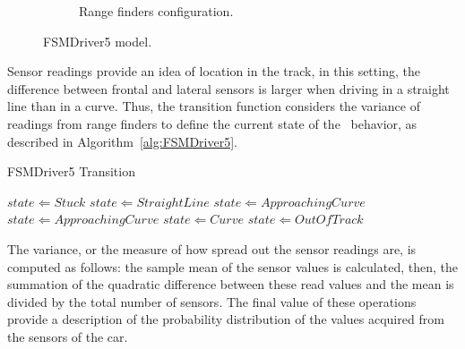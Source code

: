 \begin{figure}
\begin{subfigure}[b]{0.4\textwidth}
   \caption{Range finders configuration.}\label{fig:FSMDriver5Finders}%
\end{subfigure}
   \caption{FSMDriver5 model.}\label{fig:FSMDriver5}
\end{figure}

Sensor readings provide an idea of location in the track, in this setting, the difference between frontal and lateral sensors is larger when driving in a straight line than in a curve. Thus, the transition function considers the variance of readings from range finders to define the current state of the \racing~behavior, as described in Algorithm~\ref{alg:FSMDriver5}.

\begin{algorithm}[h]%
\caption{FSMDriver5 Transition}%
\label{alg:FSMDriver5}%
\begin{algorithmic}
        \STATE $state \Leftarrow Stuck$
    \ELSE
			\STATE $state \Leftarrow StraightLine$
			\STATE $state \Leftarrow ApproachingCurve$
			\STATE $state \Leftarrow ApproachingCurve$
			\STATE $state \Leftarrow Curve$
		\ELSE
			\STATE $state \Leftarrow Out Of Track$
		\ENDIF
	\ENDIF
\end{algorithmic}
\end{algorithm}

The variance, or the measure of how spread out the sensor readings are, is computed as follows: the sample mean of the sensor values is calculated, then, the summation of the quadratic difference between these read values and the mean is divided by the total number of sensors. The final value of these operations provide a description of the probability distribution of the values acquired from the sensors of the car.
%
%

